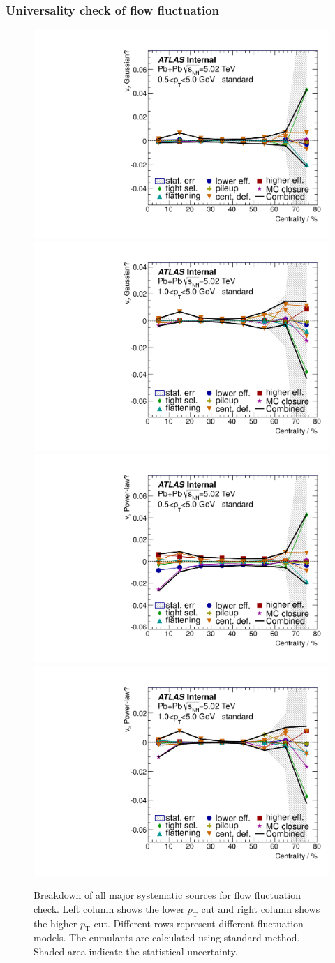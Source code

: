 \subsubsection{Universality check of flow fluctuation}
\begin{figure}[H]
\centering
\includegraphics[width=.425\linewidth]{figs/sec_sys/summary/sys_isGauss_1sub_Har2_Pt0.pdf}
\includegraphics[width=.425\linewidth]{figs/sec_sys/summary/sys_isGauss_1sub_Har2_Pt1.pdf}
\includegraphics[width=.425\linewidth]{figs/sec_sys/summary/sys_isPower_1sub_Har2_Pt0.pdf}
\includegraphics[width=.425\linewidth]{figs/sec_sys/summary/sys_isPower_1sub_Har2_Pt1.pdf}
\caption{Breakdown of all major systematic sources for flow fluctuation check. Left column shows the lower $p_\text{T}$ cut and right column shows the higher $p_\text{T}$ cut. Different rows represent different fluctuation models. The cumulants are calculated using standard method. Shaded area indicate the statistical uncertainty.}
\label{fig:sys_sum_fluc}
\end{figure}


